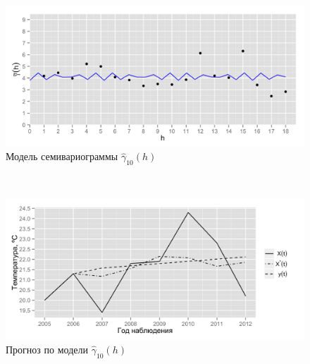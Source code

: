 \documentclass{beamer}
\begin{document}
\begin{frame}
\begin{multicols}{2}
    \columnbreak
    \begin{figure}[H]
      \begin{center}
        \begin{minipage}[H]{0.95\linewidth}
          \begin{center}
            \includegraphics[width=1\linewidth]{../../figures/variogram/auto-class-18-modeled.png} \\ Модель семивариограммы $\widehat{\gamma}_{10}(h)$
          \end{center}
        \end{minipage}
        \\
        \begin{minipage}[H]{0.95\linewidth}
          \begin{center}
            \includegraphics[width=1\linewidth]{../../figures/variogram/auto-class-18-cross-prediction.png} \\ Прогноз по модели $\widehat{\gamma}_{10}(h)$
          \end{center}
        \end{minipage}
      \end{center}
    \end{figure}
  \end{multicols}
\end{frame}
\end{document}
